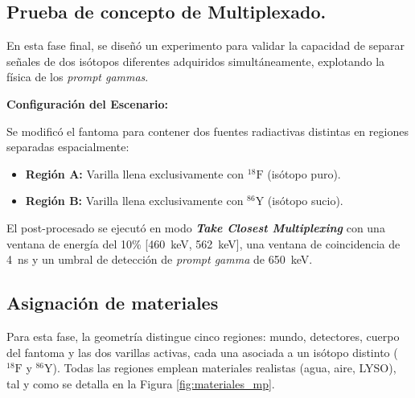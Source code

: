 \subsection{ Prueba de concepto de Multiplexado.}
\label{subsec:fase5}

En esta fase final, se diseñó un experimento para validar la capacidad de separar señales de dos isótopos diferentes adquiridos simultáneamente, explotando la física de los \textit{prompt gammas}.

\textbf{Configuración del Escenario:}

Se modificó el fantoma para contener dos fuentes radiactivas distintas en regiones separadas espacialmente:

\begin{itemize}
  \item \textbf{Región A:} Varilla llena exclusivamente con $^{18}\text{F}$ (isótopo puro).
  \item \textbf{Región B:} Varilla llena exclusivamente con $^{86}\text{Y}$ (isótopo sucio).
\end{itemize}

El post-procesado se ejecutó en modo \textbf{\textit{Take Closest Multiplexing}} con una ventana de energía del 10\% [\SI{460}{\kilo\electronvolt}, \SI{562}{\kilo\electronvolt}], una ventana de coincidencia de \SI{4}{\nano\second} y un umbral de detección de \textit{prompt gamma} de \SI{650}{\kilo\electronvolt}.

\subsection*{Asignación de materiales }

Para esta fase, la geometría distingue cinco regiones: mundo, detectores, cuerpo del fantoma y las dos varillas activas, cada una asociada a un isótopo distinto ($^{18}\text{F}$ y $^{86}\text{Y}$). Todas las regiones emplean materiales realistas (agua, aire, LYSO), tal y como se detalla en la Figura \ref{fig:materiales_mp}.

